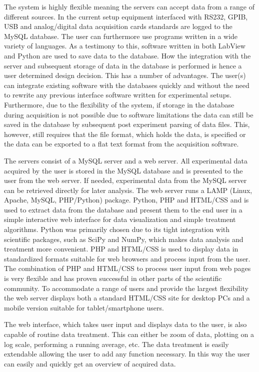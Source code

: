 The system is highly flexible meaning the servers can accept data from a range
of different sources. In the current setup equipment interfaced with RS232,
GPIB, USB and analog/digital data acquisition cards standards are logged to the
MySQL database. The user can furthermore use programs written in a wide variety
of languages. As a testimony to this, software written in both LabView and
Python are used to save data to the database. How the integration with the
server and subsequent storage of data in the database is performed is hence a
user determined design decision. This has a number of advantages.  The user(s)
can integrate existing software with the databases quickly and without the need
to rewrite any previous interface software written for experimental setups.
Furthermore, due to the flexibility of the system, if storage in the database
during acquisition is not possible due to software limitations the data can
still be saved in the database by subsequent post experiment parsing of data
files. This, however, still requires that the file format, which holds the
data, is specified or the data can be exported to a flat text format from the
acquisition software.

The servers consist of a MySQL server and a web server. All experimental data
acquired by the user is stored in the MySQL database and is presented to the
user from the web server. If needed, experimental data from the MySQL server
can be retrieved directly for later analysis. The web server runs a LAMP
(Linux, Apache, MySQL, PHP/Python) package. Python, PHP and HTML/CSS and is
used to extract data from the database and present them to the end user in a
simple interactive web interface for data visualization and simple treatment
algorithms. Python was primarily chosen due to its tight integration with
scientific packages, such as SciPy and NumPy, which makes data analysis and
treatment more convenient\cite{Cahn2007}. PHP and HTML/CSS is used to display
data in standardized formats suitable for web browsers and process input from
the user. The combination of PHP and HTML/CSS to process user input from web
pages is very flexible and has proven successful in other parts of the
scientific community\cite{Crane2008}. To accommodate a range of users and
provide the largest flexibility the web server displays both a standard HTML/CSS
site for desktop PCs and a mobile version suitable for tablet/smartphone users.


The web interface, which takes user input and displays data to the user, is also
capable of routine data treatment. This can either be zoom of data, plotting on
a log scale, performing a running average, etc. The data treatment is easily
extendable allowing the user to add any function necessary. In this way the
user can easily and quickly get an overview of acquired data.
